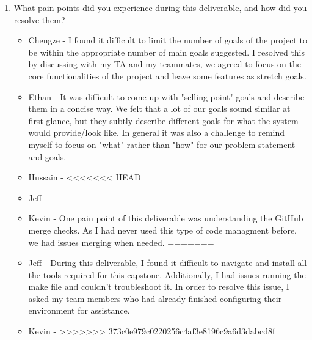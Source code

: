 \documentclass{article}
\begin{document}
\begin{enumerate}
    \item What pain points did you experience during this deliverable, and how
    did you resolve them?
    \begin{itemize}
        \item Chengze - I found it difficult to limit the number 
        of goals of the project to be within the appropriate number 
        of main goals suggested. I resolved this by discussing with 
        my TA and my teammates, we agreed to focus on the core 
        functionalities of the project and leave some features as 
        stretch goals. 
        \item Ethan - It was difficult to come up with "selling point" goals
          and describe them in a concise way. We felt that a lot of our goals
          sound similar at first glance, but they subtly describe different
          goals for what the system would provide/look like. In general it was
          also a challenge to remind myself to focus on "what" rather than
          "how" for our problem statement and goals.
        \item Hussain -
<<<<<<< HEAD
        \item Jeff - 
        \item Kevin - One pain point of this deliverable was understanding the 
        GitHub merge checks. As I had never used this type of code managment 
        before, we had issues merging when needed. 
=======
        \item Jeff - During this deliverable, I found it difficult to 
        navigate and install all the tools required for this capstone. 
        Additionally, I had issues running the make file and 
        couldn't troubleshoot it. In order to resolve this issue,
        I asked my team members who had already finished configuring their
        environment for assistance.
        \item Kevin -
>>>>>>> 373c0e979c0220256c4af3e8196c9a6d3dabcd8f
    \end{itemize}
    

\end{enumerate}
\end{document}
